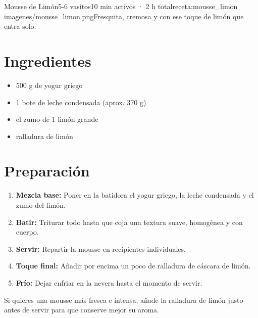 \begin{recetaConImagen}{Mousse de Limón}{5-6 vasitos}{10 min activos · 2 h total}{receta:mousse_limon}
    {imagenes/mousse_limon.png}{Fresquita, cremosa y con ese toque de limón que entra solo.}

    \begin{minipage}[t]{0.35\textwidth}
        \section*{Ingredientes}
        \begin{itemize}[leftmargin=*]
            \item 500 g de yogur griego
            \item 1 bote de leche condensada (aprox. 370 g)
            \item el zumo de 1 limón grande
            \item ralladura de limón
        \end{itemize}
    \end{minipage}
    \hfill
    \begin{minipage}[t]{0.6\textwidth}
        \section*{Preparación}
        \begin{enumerate}
            \item \textbf{Mezcla base:} Poner en la batidora el yogur griego, la leche condensada y el zumo del limón.
            \item \textbf{Batir:} Triturar todo hasta que coja una textura suave, homogénea y con cuerpo.
            \item \textbf{Servir:} Repartir la mousse en recipientes individuales.
            \item \textbf{Toque final:} Añadir por encima un poco de ralladura de cáscara de limón.
            \item \textbf{Frío:} Dejar enfriar en la nevera hasta el momento de servir.
        \end{enumerate}
    \end{minipage}

    \vspace{1em}
    \begin{tcolorbox}[colback=orange!5, colframe=orange!50, title=Consejo, size=small]
        Si quieres una mousse más fresca e intensa, añade la ralladura de limón justo antes de servir para que conserve mejor su aroma.
    \end{tcolorbox}
\end{recetaConImagen}
